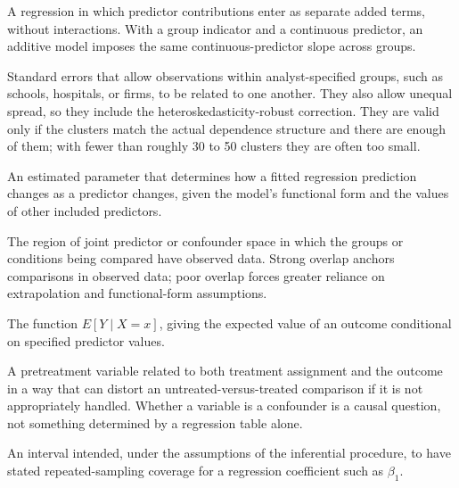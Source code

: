 \documentclass[11pt]{report}
\begin{document}
\begin{description}[style=nextline,leftmargin=0pt,labelindent=0pt,font=\bfseries]
\item[Additive model] A regression in which predictor contributions enter as separate added terms, without interactions. With a group indicator and a continuous predictor, an additive model imposes the same continuous-predictor slope across groups.

\item[Clustered standard errors] Standard errors that allow observations within analyst-specified groups, such as schools, hospitals, or firms, to be related to one another. They also allow unequal spread, so they include the heteroskedasticity-robust correction. They are valid only if the clusters match the actual dependence structure and there are enough of them; with fewer than roughly 30 to 50 clusters they are often too small.

\item[Coefficient] An estimated parameter that determines how a fitted regression prediction changes as a predictor changes, given the model's functional form and the values of other included predictors.

\item[Common support / overlap] The region of joint predictor or confounder space in which the groups or conditions being compared have observed data. Strong overlap anchors comparisons in observed data; poor overlap forces greater reliance on extrapolation and functional-form assumptions.

\item[Conditional expectation function (CEF)] The function \(E[Y\mid X=x]\), giving the expected value of an outcome conditional on specified predictor values.

\item[Confounder] A pretreatment variable related to both treatment assignment and the outcome in a way that can distort an untreated-versus-treated comparison if it is not appropriately handled. Whether a variable is a confounder is a causal question, not something determined by a regression table alone.

\item[Confidence interval for a coefficient] An interval intended, under the assumptions of the inferential procedure, to have stated repeated-sampling coverage for a regression coefficient such as \(\beta_1\).


\end{description}
\end{document}
